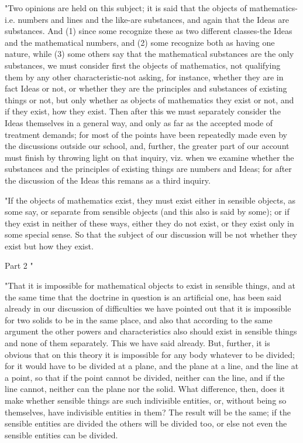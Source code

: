 "Two opinions are held on this subject; it is said that the objects
of mathematics-i.e. numbers and lines and the like-are substances,
and again that the Ideas are substances. And (1) since some recognize
these as two different classes-the Ideas and the mathematical numbers,
and (2) some recognize both as having one nature, while (3) some others
say that the mathematical substances are the only substances, we must
consider first the objects of mathematics, not qualifying them by
any other characteristic-not asking, for instance, whether they are
in fact Ideas or not, or whether they are the principles and substances
of existing things or not, but only whether as objects of mathematics
they exist or not, and if they exist, how they exist. Then after this
we must separately consider the Ideas themselves in a general way,
and only as far as the accepted mode of treatment demands; for most
of the points have been repeatedly made even by the discussions outside
our school, and, further, the greater part of our account must finish
by throwing light on that inquiry, viz. when we examine whether the
substances and the principles of existing things are numbers and Ideas;
for after the discussion of the Ideas this remans as a third inquiry.

"If the objects of mathematics exist, they must exist either in sensible
objects, as some say, or separate from sensible objects (and this
also is said by some); or if they exist in neither of these ways,
either they do not exist, or they exist only in some special sense.
So that the subject of our discussion will be not whether they exist
but how they exist. 

Part 2 "

"That it is impossible for mathematical objects to exist in sensible
things, and at the same time that the doctrine in question is an artificial
one, has been said already in our discussion of difficulties we have
pointed out that it is impossible for two solids to be in the same
place, and also that according to the same argument the other powers
and characteristics also should exist in sensible things and none
of them separately. This we have said already. But, further, it is
obvious that on this theory it is impossible for any body whatever
to be divided; for it would have to be divided at a plane, and the
plane at a line, and the line at a point, so that if the point cannot
be divided, neither can the line, and if the line cannot, neither
can the plane nor the solid. What difference, then, does it make whether
sensible things are such indivisible entities, or, without being so
themselves, have indivisible entities in them? The result will be
the same; if the sensible entities are divided the others will be
divided too, or else not even the sensible entities can be divided.

